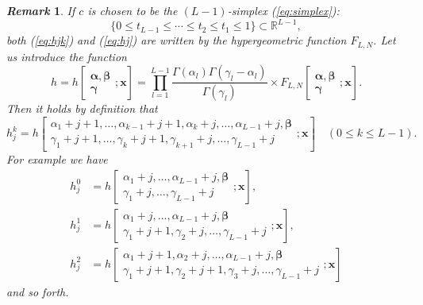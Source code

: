 \documentclass[12pt]{article}
\newtheorem{remark}[thm]{\it Remark}
\numberwithin{equation}{section}
\begin{document}
\begin{remark} \rm
If $c$ is chosen to be the $(L-1)$-simplex
(\ref{eq:simplex}):
\[
\{0 \leq t_{L-1} \leq \cdots \leq t_2 \leq t_1 \leq 1 \} \subset {\mathbb R}^{L-1},
\]
both (\ref{eq:hjk}) and (\ref{eq:hj})
are
written by the hypergeometric function $F_{L,N}$.
Let us introduce the function
\[
h=h
\left[
\begin{array}{c}
{\boldsymbol \alpha}, {\boldsymbol \beta} \\
{\boldsymbol  \gamma}
\end{array}
; {\boldsymbol x}
\right]
=
\prod_{l=1}^{L-1} \frac{\Gamma(\alpha_l) \Gamma(\gamma_l-\alpha_l)}{\Gamma(\gamma_l)}
\times
F_{L,N}
\left[
\begin{array}{c}
{\boldsymbol \alpha}, {\boldsymbol \beta} \\
{\boldsymbol  \gamma}
\end{array}
; {\boldsymbol x}
\right].
\]
Then it holds by definition that
\[
h_j^k=
h\left[
\begin{array}{c}
\alpha_1+j+1, \ldots,\alpha_{k-1}+j+1, \alpha_{k}+j, \ldots, \alpha_{L-1}+j,
{\boldsymbol \beta}
\\
\gamma_1+j+1,\ldots,\gamma_{k}+j+1,\gamma_{k+1}+j, \ldots, \gamma_{L-1}+j
\end{array}
; {\boldsymbol x}
\right]
\quad (0 \leq k \leq L-1).
\]
For example we have
\begin{align*}
h^0_j &=
h\left[
\begin{array}{c}
\alpha_1+j, \ldots,\alpha_{L-1}+j,
{\boldsymbol \beta}
\\
\gamma_1+j,\ldots,\gamma_{L-1}+j
\end{array}
; {\boldsymbol x}
\right],
\\
h_j^1&=
h\left[
\begin{array}{c}
\alpha_{1}+j, \ldots, \alpha_{L-1}+j,
{\boldsymbol \beta}
\\
\gamma_1+j+1,\gamma_{2}+j, \ldots, \gamma_{L-1}+j
\end{array}
; {\boldsymbol x}
\right],
\\
h_j^2&=
h\left[
\begin{array}{c}
\alpha_{1}+j+1, \alpha_{2}+j,\ldots, \alpha_{L-1}+j,
{\boldsymbol \beta}
\\
\gamma_1+j+1,\gamma_{2}+j+1 ,\gamma_{3}+j, \ldots, \gamma_{L-1}+j
\end{array}
; {\boldsymbol x}
\right]
\end{align*}
and so forth.
\end{remark}
\end{document}
